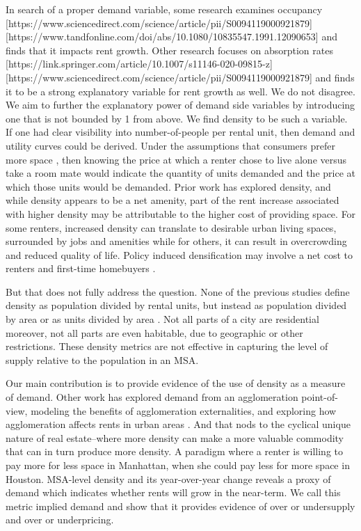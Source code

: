 \documentclass[sn-mathphys-num]{sn-jnl}%
\theoremstyle{thmstyleone}%
\theoremstyle{thmstyletwo}%
\theoremstyle{thmstylethree}%
\begin{document}
In search of a proper demand variable, some research examines occupancy [https://www.sciencedirect.com/science/article/pii/S0094119000921879][https://www.tandfonline.com/doi/abs/10.1080/10835547.1991.12090653] \cite{mueller1999real} and finds that it impacts rent growth. Other research focuses on absorption rates [https://link.springer.com/article/10.1007/s11146-020-09815-z] [https://www.sciencedirect.com/science/article/pii/S0094119000921879] and finds it to be a strong explanatory variable for rent growth as well. 
We do not disagree. We aim to further the explanatory power of demand side variables by introducing one that is not bounded by 1 from above. We find density to be such a variable. If one had clear visibility into number-of-people per rental unit, then demand and utility curves could be derived. Under the assumptions that consumers prefer more space \cite{molloy2022housing}, then knowing the price at which a renter chose to live alone versus take a room mate would indicate the quantity of units demanded and the price at which those units would be demanded. Prior work has explored density, and while density appears to be a net amenity, part of the rent increase associated with higher density may be attributable to the higher cost of providing space. For some renters, increased density can translate to desirable urban living spaces, surrounded by jobs and amenities while for others, it can result in overcrowding and reduced quality of life. Policy induced densification may involve a net cost to renters and first-time homebuyers \cite{ahlfeldt2019economic} \cite{albouy2015driving}. 
  
But that does not fully address the question. None of the previous studies define density as population divided by rental units, but instead as population divided by area or as units divided by area . Not all parts of a city are residential moreover, not all parts are even habitable, due to geographic or other restrictions. These density metrics are not effective in capturing the level of supply relative to the population in an MSA.  

Our main contribution is to provide evidence of the use of density as a measure of demand. Other work has explored demand from an agglomeration point-of-view, modeling the benefits of agglomeration externalities, and exploring how agglomeration affects rents in urban areas \cite{titman2024city} \cite{liu2018vertical}. And that nods to the cyclical unique nature of real estate--where more density can make a more valuable commodity that can in turn produce more density. A paradigm where a renter is willing to pay more for less space in Manhattan, when she could pay less for more space in Houston. MSA-level density and its year-over-year change reveals a proxy of demand which indicates whether rents will grow in the near-term. We call this metric implied demand and show that it provides evidence of over or undersupply and over or underpricing.  
\end{document}
